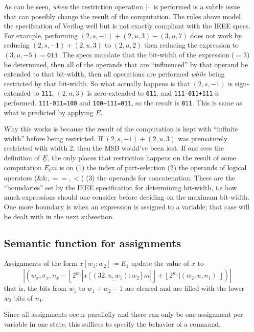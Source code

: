 \documentclass[fleqn]{article}
\theoremstyle{definition}
\begin{document}
As can be seen, \textit{when} the restriction operation $|\cdot|$ is performed is a subtle issue that can possibly change the result of the computation. The rules above model the specification of Verilog well but is not exactly compliant with the IEEE specs. For example, performing $(2, s, -1)+(2, u, 3)-(3, u, 7)$ does not work by reducing $(2, s, -1)+(2, u, 3)$ to $(2, u, 2)$ then reducing the expression to $(3, u, -5)=\mathtt{011}$. The specs mandate that the bit-width of the expression ($=3$) be determined, then all of the operands that are ``influenced'' by that operand be extended to that bit-width, then all operations are performed \textit{while} being restricted by that bit-width. So what actually happens is that $(2, s, -1)$ is sign-extended to \texttt{111}, $(2, u, 3)$ is zero-extended to \texttt{011}, and \texttt{111-011+111} is performed. \texttt{111-011=100} and \texttt{100+111=011}, so the result is \texttt{011}. This is same as what is predicted by applying $\underline{E}$.

Why this works is because the result of the computation is kept with ``infinite width'' before being restricted. If $(2,s,-1)+(2,u,3)$ was prematurely restricted with width 2, then the MSB would've been lost. If one sees the definition of $\underline{E}$, the only places that restriction happens on the result of some computation $\underline{E_{i}}m$ is on (1) the index of part-selection (2) the operands of logical operators ($\&\&, ==, <$) (3) the operands for concatenation. These are the ``boundaries'' set by the IEEE specification for determining bit-width, i.e how much expressions should one consider before deciding on the maximum bit-width. One more boundary is when an expression is assigned to a variable; that case will be dealt with in the next subsection.
\subsection{Semantic function for assignments}
Assignments of the form $x[w_{1}:w_{2}]\coloneq E_{1}$ update the value of $x$ to
\[
  \left|\left(w_{x},\sigma_{x},n_{x}-\left\lfloor2^{w_{1}}\left|\underline{x[(32,u,w_{1}):w_{2}]}m\right|\right\rfloor+\left\lfloor 2^{w_{1}}\left|(w_{2},u,n_{1})\right|\right\rfloor\right)\right|
\]
that is, the bits from $w_{1}$ to $w_{1}+w_{2}-1$ are cleared and are filled with the lower $w_{2}$ bits of $n_{1}$.

Since all assignments occur parallelly and there can only be one assignment per variable in one state, this suffices to specify the behavior of a command.
\end{document}
